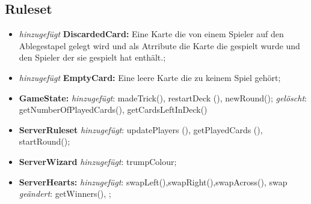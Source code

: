 \documentclass{article}
\begin{document}
\subsection{Ruleset}

\begin{itemize}
\item \textit{hinzugefügt} \textbf{DiscardedCard:} Eine Karte die von einem Spieler auf den Ablegestapel gelegt wird und als Atrribute die Karte die gespielt wurde und den Spieler der sie gespielt hat 
enthält.;

\item \textit{hinzugefügt} \textbf{EmptyCard:} Eine leere Karte die zu keinem Spiel gehört;

\item \textbf{GameState:} \textit{hinzugefügt}: madeTrick(), restartDeck (), newRound(); \textit{gelöscht}: getNumberOfPlayedCards(), getCardsLeftInDeck()

\item \textbf{ServerRuleset} \textit{hinzugefügt}: updatePlayers (), getPlayedCards (), startRound(); 

\item \textbf{ServerWizard} \textit{hinzugefügt}: trumpColour; 

\item \textbf{ServerHearts:} \textit{hinzugefügt}: swapLeft(),swapRight(),swapAcross(), swap
\textit{geändert}: getWinners(),  ;
\end{itemize}
\end{document}
